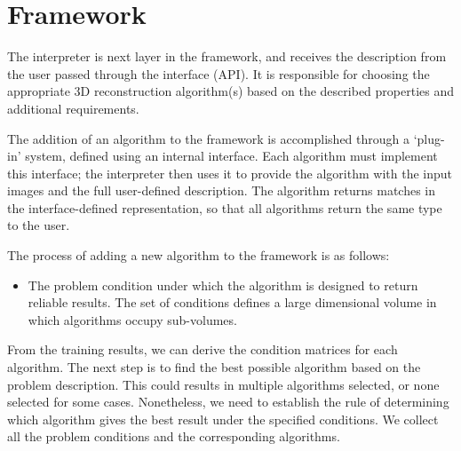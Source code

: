 \section{Framework}
The interpreter is next layer in the framework, and receives the description from the user passed through the interface (\eg API). It is responsible for choosing the appropriate 3D reconstruction algorithm(s) based on the described properties and additional requirements.

The addition of an algorithm to the framework is accomplished through a `plug-in' system, defined using an internal interface. Each algorithm must implement this interface; the interpreter then uses it to provide the algorithm with the input images and the full user-defined description. The algorithm returns matches in the interface-defined representation, so that all algorithms return the same type to the user.

The process of adding a new algorithm to the framework is as follows:
\begin{itemize}
\item The problem condition under which the algorithm is designed to return reliable results. The set of conditions defines a large dimensional volume in which algorithms occupy sub-volumes.
\end{itemize}

From the training results, we can derive the condition matrices for each algorithm. The next step is to find the best possible algorithm based on the problem description. This could results in multiple algorithms selected, or none selected for some cases. Nonetheless, we need to establish the rule of determining which algorithm gives the best result under the specified conditions. We collect all the problem conditions and the corresponding algorithms.

